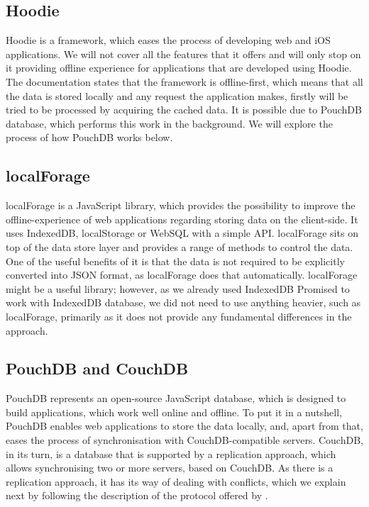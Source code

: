 \subsection*{Hoodie}

Hoodie is a framework, which eases the process of developing web and iOS applications. We will not cover all the features that it offers and will only stop on it providing offline experience for applications that are developed using Hoodie. The documentation states that the framework is offline-first\cite{23}, which means that all the data is stored locally and any request the application makes, firstly will be tried to be processed by acquiring the cached data. It is possible due to PouchDB database, which performs this work in the background\cite{24}. We will explore the process of how PouchDB works below.

\subsection*{localForage}

localForage is a JavaScript library, which provides the possibility to improve the offline-experience of web applications regarding storing data on the client-side. It uses IndexedDB, localStorage or WebSQL with a simple API. localForage sits on top of the data store layer and provides a range of methods to control the data. One of the useful benefits of it is that the data is not required to be explicitly converted into JSON format, as localForage does that automatically\cite{25}. localForage might be a useful library; however, as we already used IndexedDB Promised to work with IndexedDB database, we did not need to use anything heavier, such as localForage, primarily as it does not provide any fundamental differences in the approach.

\subsection*{PouchDB and CouchDB}

PouchDB represents an open-source JavaScript database, which is designed to build applications, which work well online and offline. To put it in a nutshell, PouchDB enables web applications to store the data locally, and, apart from that, eases the process of synchronisation with CouchDB-compatible servers. CouchDB, in its turn, is a database that is supported by a replication approach, which allows synchronising two or more servers, based on CouchDB. As there is a replication approach, it has its way of dealing with conflicts, which we explain next by following the description of the protocol offered by \citet{26}. 

